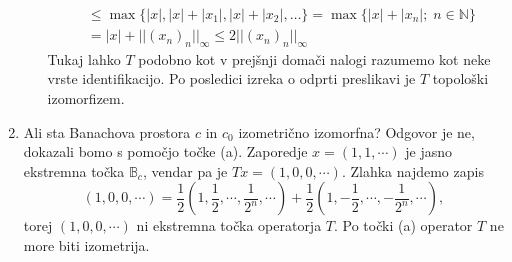 \documentclass[a4paper, 12pt]{article}
\newcommand{\B}{\mathbb{B}}
\newcommand{\N}{\mathbb{N}}
\begin{document}
\begin{enumerate}[label=(\alph*)]
\begin{itemize}
\begin{align*}
		&\leq \max\lbrace |x|, |x| + |x_1|, |x| + |x_2|, \dots \rbrace = \max\lbrace |x| + |x_n| ;\; n \in \N\rbrace \\
		&= |x| + ||(x_n)_n||_\infty \leq 2 ||(x_n)_n||_\infty
		\end{align*}
		Tukaj lahko $T$ podobno kot v prejšnji domači nalogi razumemo kot neke vrste identifikacijo. Po posledici izreka o odprti preslikavi je $T$ topološki izomorfizem.
	\end{itemize}
	\item Ali sta Banachova prostora $c$ in $c_0$ izometrično izomorfna? Odgovor je ne, dokazali bomo s pomočjo točke (a). Zaporedje $x = (1, 1, \cdots)$ je jasno ekstremna točka $\B_c$, vendar pa je $Tx = (1, 0, 0,\cdots)$. Zlahka najdemo zapis
	\[
	(1, 0, 0, \cdots) = \frac{1}{2}(1, \frac{1}{2}, \cdots, \frac{1}{2^n}, \cdots) + \frac{1}{2}(1, -\frac{1}{2}, \cdots, -\frac{1}{2^n}, \cdots),
	\]
	torej $(1, 0, 0, \cdots)$ ni ekstremna točka operatorja $T$. Po točki (a) operator $T$ ne more biti izometrija.
\end{enumerate}
\end{document}
